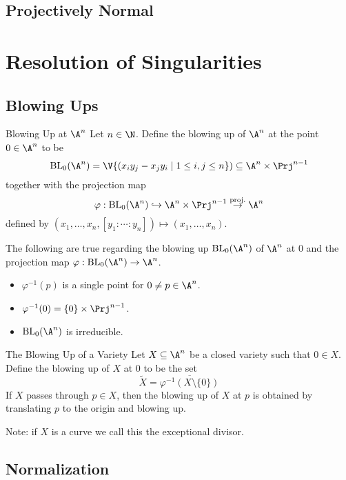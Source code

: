 \documentclass[a4paper]{article}
\begin{document}
\subsection{Projectively Normal}

\pagebreak
\section{Resolution of Singularities}
\subsection{Blowing Ups}
\begin{defn}{Blowing Up at $\A^n$}{} Let $n\in\N$. Define the blowing up of $\A^n$ at the point $0\in\A^n$ to be $$\text{BL}_0(\A^n)=\V\{(x_iy_j-x_jy_i\;|\;1\leq i,j\leq n\})\subseteq\A^n\times\Prj^{n-1}$$ together with the projection map $$\varphi:\text{BL}_0(\A^n)\hookrightarrow\A^n\times\Prj^{n-1}\overset{\text{proj.}}{\rightarrow}\A^n$$ defined by $(x_1,\dots,x_n,[y_1:\cdots:y_n])\mapsto(x_1,\dots,x_n)$. 
\end{defn}

\begin{prp}{}{} The following are true regarding the blowing up $\text{BL}_0(\A^n)$ of $\A^n$ at $0$ and the projection map $\varphi:\text{BL}_0(\A^n)\to\A^n$. 
\begin{itemize}
\item $\varphi^{-1}(p)$ is a single point for $0\neq p\in\A^n$. 
\item $\varphi^{-1}(0)=\{0\}\times\Prj^{n-1}$. 
\item $\text{BL}_0(\A^n)$ is irreducible. 
\end{itemize}
\end{prp}

\begin{defn}{The Blowing Up of a Variety}{} Let $X\subseteq\A^n$ be a closed variety such that $0\in X$. Define the blowing up of $X$ at $0$ to be the set $$\widetilde{X}=\overline{\varphi^{-1}(X\setminus\{0\})}$$ If $X$ passes through $p\in X$, then the blowing up of $X$ at $p$ is obtained by translating $p$ to the origin and blowing up. 
\end{defn}

Note: if $X$ is a curve we call this the exceptional divisor. 

\subsection{Normalization}
\end{document}
